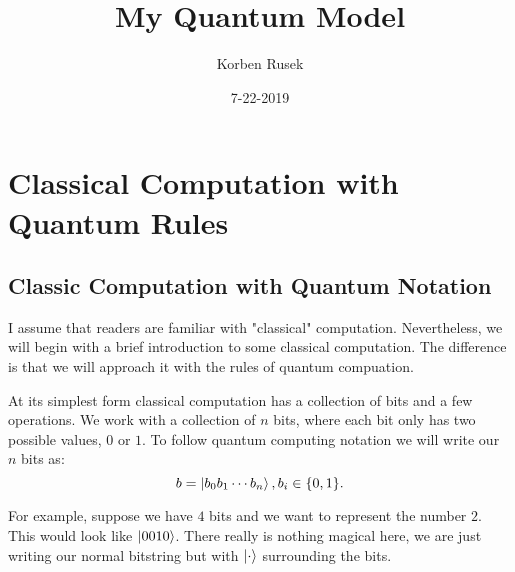 \documentclass{article}
\author{Korben Rusek}
\title{My Quantum Model}
\date{7-22-2019}
\begin{document}
\maketitle
\newcommand{\gindex}[2]{|#1\!:\!#2|}
\newcommand{\lcm}{\textrm{lcm}}
\newcommand{\irr}{\textrm{irr}}
\newcommand{\sylp}{$Syl_{p}$}
\newcommand{\phnt}[1]{$\phantom{1}^{#1}$}
\newcommand{\gen}[1]{\langle#1\rangle}
\newcommand{\BN}{\mathbb{N}}
\newcommand{\BZ}{\mathbb{Z}}
\newcommand{\BQ}{\mathbb{Q}}
\newcommand{\BR}{\mathbb{R}}
\newcommand{\BC}{\mathbb{C}}
\newcommand{\BF}{\mathbb{F}}
\newcommand{\CF}{\mathcal{F}}
\newcommand{\CQ}{\mathcal{Q}}
\newcommand{\fa}{\mathfrak{a}}
\newcommand{\fb}{\mathfrak{b}}
\newcommand{\fp}{\mathfrak{p}}
\newcommand{\fq}{\mathfrak{q}}
\newcommand{\fm}{\mathfrak{m}}
\newcommand{\FN}{\mathfrak{N}}
\newcommand{\FR}{\mathfrak{R}}
\newcommand{\set}[1]{\{#1\}}
\newcommand{\trv}{\set{1}}
\newcommand{\Aut}{\mathrm{Aut}}
\newcommand{\End}{\mathrm{End}}
\newcommand{\Ker}{\mathrm{Ker}}
\newcommand{\chr}{\mathrm{char}}
\theoremstyle{definition}
\newtheorem{theorem}{Theorem}[section]
\newtheorem{definition}[theorem]{Definition}
\newtheorem{postulate}{Postulate}[section]

\section{Classical Computation with Quantum Rules}

\subsection{Classic Computation with Quantum Notation}

I assume that readers are familiar with "classical" computation. Nevertheless,
we will begin with a brief introduction to some classical computation. The 
difference is that we will approach it with the rules of quantum compuation.

At its simplest form classical computation has a collection of bits and a few
operations. We work with a collection of $n$ bits, where each bit only has
two possible values, $0$ or $1$. To follow quantum computing notation we will
write our $n$ bits as:
\[b=\ket{b_0b_1\cdots b_n}, b_i\in\{0,1\}.\]

For example, suppose we have $4$ bits and we want to represent the number $2$. 
This would look like $\ket{0010}$. There really is nothing magical here, we are
just writing our normal bitstring but with $\ket{\cdot}$ surrounding the bits.
\end{document}
